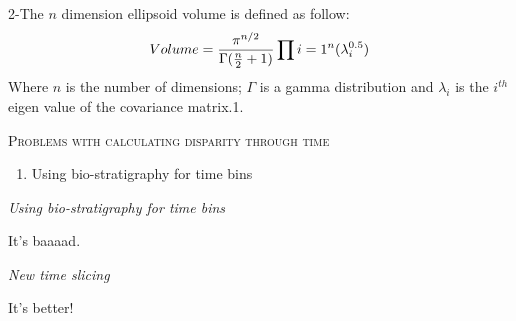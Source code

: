 \documentclass[12pt,letterpaper]{article}
\renewcommand{\section}[1]{%
\bigskip
\begin{center}
\begin{Large}
\normalfont\scshape #1
\medskip
\end{Large}
\end{center}}
\renewcommand{\subsection}[1]{%
\bigskip
\begin{center}
\begin{large}
\normalfont\itshape #1
\end{large}
\end{center}}
\begin{document}
2-The $n$ dimension ellipsoid volume is defined as follow:
\begin{equation}
Volume={{\pi^{n/2}} \over {\Gamma({n\over2}+1)}}\prod\limits{i=1}^n(\lambda_{i}^{0.5})
\end{equation}
Where $n$ is the number of dimensions; $\Gamma$ is a gamma distribution and $\lambda_i$ is the $i^{th}$ eigen value of the covariance matrix.1.




\section{Problems with calculating disparity through time}

\begin{enumerate}
\item{Using bio-stratigraphy for time bins}
\end{enumerate}

\subsection{Using bio-stratigraphy for time bins}

It's baaaad.

\subsection{New time slicing}

It's better!
\end{document}
